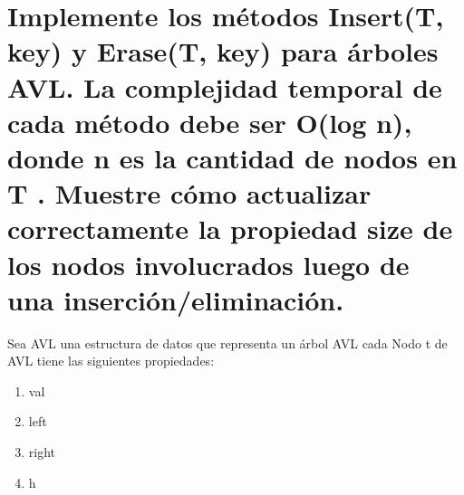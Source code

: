 \documentclass[10pt,a4paper]{article}
\begin{document}
    \section{Implemente los métodos Insert(T, key) y Erase(T, key) para árboles AVL. La complejidad temporal de
    cada método debe ser O(log n), donde n es la cantidad de nodos en T . Muestre cómo actualizar correctamente
    la propiedad size de los nodos involucrados luego de una inserción/eliminación.
    }

    Sea AVL una estructura de datos que representa un árbol AVL
    cada Nodo t de AVL tiene las siguientes propiedades:
    \begin{enumerate}
        \item val
        \item left
        \item right
        \item h
    \end{enumerate}
\end{document}
